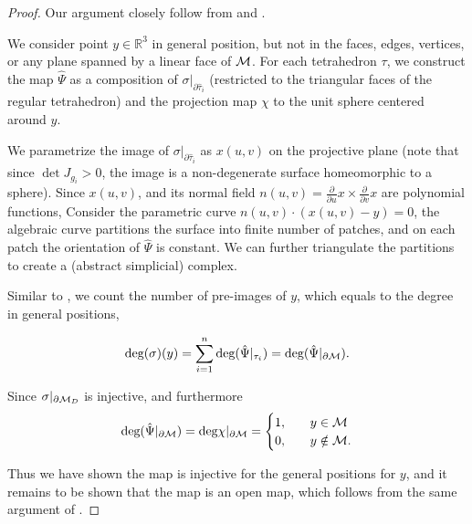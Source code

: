 \begin{proof}
Our argument closely follow from \cite[Appendix B]{aigerman2013injective} and
\cite[Theorem 1]{lipman2014bijective}.

We consider point $y \in \mathbb{R}^3$ in general position, but not in the faces, edges, vertices, 
or any plane spanned by a linear face of $\mathcal{M}$.
For each tetrahedron $\tau$, 
we construct the map $\hat{\Psi}$ as a composition of $\sigma|_{\partial\hat \tau_i}$ (restricted to the triangular faces of the regular tetrahedron) and the projection map $\chi$ to the unit sphere centered around $y$.

We parametrize the image of $\sigma|_{\partial\hat \tau_i}$ as $x(u,v)$ {on the projective plane}
(note that since $\det J_{g_i} > 0$, 
the image is a non-degenerate surface homeomorphic to a sphere). 
{Since $x(u,v)$, and its normal field $n(u,v) = \frac{\partial}{\partial u}x \times \frac{\partial}{\partial v}x$ are polynomial functions,}
Consider the parametric curve $n(u,v)\cdot (x(u,v) - y)  = 0$, the algebraic curve partitions the surface into finite number of patches, and on each patch the orientation of  $\hat{\Psi}$ is constant. 
We can further triangulate the partitions to create a {(abstract simplicial)} complex.

Similar to \cite[Appendix B]{aigerman2013injective}, we count the number of pre-images of $y$, {which equals to the degree in general positions,}

\[
\text{deg}(\sigma)(y) = 
\sum_{i=1}^n \text{deg}(\hat\Psi|_{\tau_i}) = 
\text{deg}(\hat\Psi|_{\partial \mathcal{M}}).
\]

Since $\sigma|_{\partial \mathcal{M}_D}$ is injective, and furthermore
\[
\text{deg}(\hat\Psi|_{\partial \mathcal{M}}) = 
\text{deg} \chi |_{\partial \mathcal{M}} = \begin{cases}
1,\quad& y\in\mathcal{M}\\
0,\quad& y\notin \mathcal{M}.
\end{cases}
\]

Thus we have shown the map is injective for the general positions {for $y$}, 
and it remains to be shown that the map is an open map, 
which follows from the same argument of {\cite[Lemma 2]{lipman2014bijective}}.

\end{proof}